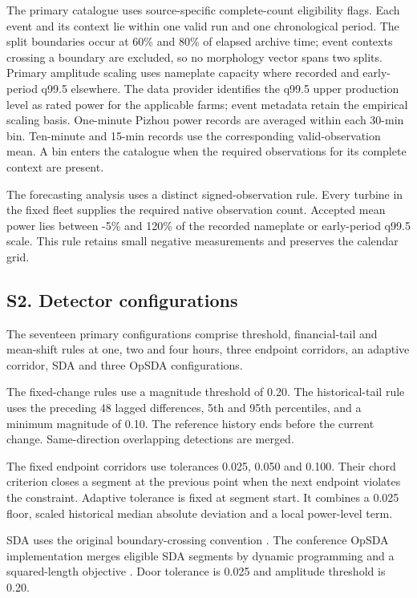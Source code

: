 \documentclass[a4paper,11pt]{article}
\begin{document}
The primary catalogue uses source-specific complete-count eligibility flags. Each event and its context lie within one valid run and one chronological period. The split boundaries occur at 60\% and 80\% of elapsed archive time; event contexts crossing a boundary are excluded, so no morphology vector spans two splits. Primary amplitude scaling uses nameplate capacity where recorded and early-period q99.5 elsewhere. The data provider identifies the q99.5 upper production level as rated power for the applicable farms; event metadata retain the empirical scaling basis. One-minute Pizhou power records are averaged within each 30-min bin. Ten-minute and 15-min records use the corresponding valid-observation mean. A bin enters the catalogue when the required observations for its complete context are present.

The forecasting analysis uses a distinct signed-observation rule. Every turbine in the fixed fleet supplies the required native observation count. Accepted mean power lies between -5\% and 120\% of the recorded nameplate or early-period q99.5 scale. This rule retains small negative measurements and preserves the calendar grid.

\subsection{S2. Detector configurations}\label{s2.-detector-configurations}

The seventeen primary configurations comprise threshold, financial-tail and mean-shift rules at one, two and four hours, three endpoint corridors, an adaptive corridor, SDA and three OpSDA configurations.

The fixed-change rules use a magnitude threshold of 0.20. The historical-tail rule uses the preceding 48 lagged differences, 5th and 95th percentiles, and a minimum magnitude of 0.10. The reference history ends before the current change. Same-direction overlapping detections are merged.

The fixed endpoint corridors use tolerances 0.025, 0.050 and 0.100. Their chord criterion closes a segment at the previous point when the next endpoint violates the constraint. Adaptive tolerance is fixed at segment start. It combines a 0.025 floor, scaled historical median absolute deviation and a local power-level term.

SDA uses the original boundary-crossing convention \citep{florita2013}. The conference OpSDA implementation merges eligible SDA segments by dynamic programming and a squared-length objective \citep{cui2015}. Door tolerance is 0.025 and amplitude threshold is 0.20.
\end{document}
